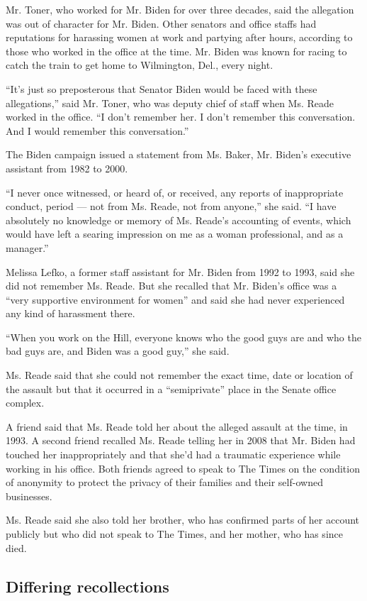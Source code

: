 Mr. Toner, who worked for Mr. Biden for over three decades, said the
allegation was out of character for Mr. Biden. Other senators and office
staffs had reputations for harassing women at work and partying after
hours, according to those who worked in the office at the time. Mr.
Biden was known for racing to catch the train to get home to Wilmington,
Del., every night.

``It's just so preposterous that Senator Biden would be faced with these
allegations,'' said Mr. Toner, who was deputy chief of staff when Ms.
Reade worked in the office. ``I don't remember her. I don't remember
this conversation. And I would remember this conversation.''

The Biden campaign issued a statement from Ms. Baker, Mr. Biden's
executive assistant from 1982 to 2000.

``I never once witnessed, or heard of, or received, any reports of
inappropriate conduct, period --- not from Ms. Reade, not from anyone,''
she said. ``I have absolutely no knowledge or memory of Ms. Reade's
accounting of events, which would have left a searing impression on me
as a woman professional, and as a manager.''

Melissa Lefko, a former staff assistant for Mr. Biden from 1992 to 1993,
said she did not remember Ms. Reade. But she recalled that Mr. Biden's
office was a ``very supportive environment for women'' and said she had
never experienced any kind of harassment there.

``When you work on the Hill, everyone knows who the good guys are and
who the bad guys are, and Biden was a good guy,'' she said.

Ms. Reade said that she could not remember the exact time, date or
location of the assault but that it occurred in a ``semiprivate'' place
in the Senate office complex.

A friend said that Ms. Reade told her about the alleged assault at the
time, in 1993. A second friend recalled Ms. Reade telling her in 2008
that Mr. Biden had touched her inappropriately and that she'd had a
traumatic experience while working in his office. Both friends agreed to
speak to The Times on the condition of anonymity to protect the privacy
of their families and their self-owned businesses.

Ms. Reade said she also told her brother, who has confirmed parts of her
account publicly but who did not speak to The Times, and her mother, who
has since died.

\hypertarget{differing-recollections}{%
\subsection{Differing recollections}\label{differing-recollections}}

